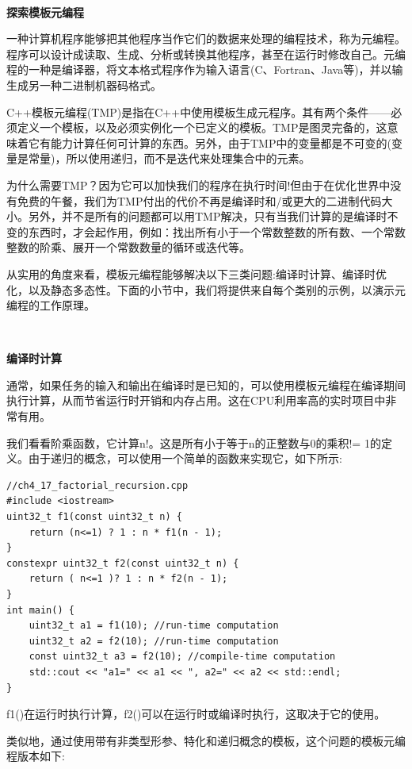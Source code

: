 \noindent\textbf{}\ \par
\textbf{探索模板元编程} \ \par
一种计算机程序能够把其他程序当作它们的数据来处理的编程技术，称为元编程。程序可以设计成读取、生成、分析或转换其他程序，甚至在运行时修改自己。元编程的一种是编译器，将文本格式程序作为输入语言(C、Fortran、Java等)，并以输生成另一种二进制机器码格式。\par
C++模板元编程(TMP)是指在C++中使用模板生成元程序。其有两个条件——必须定义一个模板，以及必须实例化一个已定义的模板。TMP是图灵完备的，这意味着它有能力计算任何可计算的东西。另外，由于TMP中的变量都是不可变的(变量是常量)，所以使用递归，而不是迭代来处理集合中的元素。 \par
为什么需要TMP？因为它可以加快我们的程序在执行时间!但由于在优化世界中没有免费的午餐，我们为TMP付出的代价不再是编译时和/或更大的二进制代码大小。另外，并不是所有的问题都可以用TMP解决，只有当我们计算的是编译时不变的东西时，才会起作用，例如：找出所有小于一个常数整数的所有数、一个常数整数的阶乘、展开一个常数数量的循环或迭代等。 \par
从实用的角度来看，模板元编程能够解决以下三类问题:编译时计算、编译时优化，以及静态多态性。下面的小节中，我们将提供来自每个类别的示例，以演示元编程的工作原理。 \par

\noindent\textbf{}\ \par
\textbf{编译时计算} \ \par
通常，如果任务的输入和输出在编译时是已知的，可以使用模板元编程在编译期间执行计算，从而节省运行时开销和内存占用。这在CPU利用率高的实时项目中非常有用。 \par
我们看看阶乘函数，它计算n!。这是所有小于等于n的正整数与0的乘积!= 1的定义。由于递归的概念，可以使用一个简单的函数来实现它，如下所示: \par

\begin{lstlisting}[caption={}]
//ch4_17_factorial_recursion.cpp
#include <iostream>
uint32_t f1(const uint32_t n) {
	return (n<=1) ? 1 : n * f1(n - 1);
}
constexpr uint32_t f2(const uint32_t n) {
	return ( n<=1 )? 1 : n * f2(n - 1);
}
int main() {
	uint32_t a1 = f1(10); //run-time computation
	uint32_t a2 = f2(10); //run-time computation
	const uint32_t a3 = f2(10); //compile-time computation
	std::cout << "a1=" << a1 << ", a2=" << a2 << std::endl;
}
\end{lstlisting}

f1()在运行时执行计算，f2()可以在运行时或编译时执行，这取决于它的使用。 \par
类似地，通过使用带有非类型形参、特化和递归概念的模板，这个问题的模板元编程版本如下:\par

